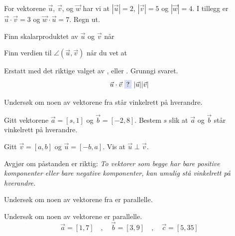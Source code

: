 For vektorene $\vec{u}$, $\vec{v}$, og $\vec{w}$ har vi at $|\vec{u}|=2$, $|\vec{v}|=5$ og $|\vec{w}|=4$. I tillegg er $\vec{u}\cdot\vec{v}=3$ og $\vec{w}\cdot\vec{u}=7$. Regn ut. \os
{}

\newpage

Finn skalarproduktet av $\vec{u}$ og $\vec{v}$ når 

Finn verdien til $\angle(\vec{u}, \vec{v})$ når du vet at

Erstatt  med det riktige valget av \sym{$\geq$}, \sym{$\leq$} eller \sym{$=$}. Grunngi svaret.
\[ \vec{u}\cdot\vec{v}\;\sym{?}\;|\vec{u}||\vec{v}| \] 


\nes

Undersøk om noen av vektorene fra  står vinkelrett på hverandre.

Gitt vektorene $\vec{a}=[s, 1]$ og $\vec{b}=[-2, 8]$. Bestem $s$ slik at $\vec{a}$ og $\vec{b}$ står vinkelrett på hverandre.

Gitt $\vec{v}=[a, b]$ og $\vec{u}=[-b, a]$. Vis at $\vec{u}\perp\vec{v}$.

 Avgjør om påstanden er riktig: \textsl{To vektorer som begge har bare positive komponenter eller bare negative komponenter, kan umulig stå vinkelrett på hverandre.}
\newpage

\nes
{}
Undersøk om noen av vektorene fra  er parallelle.

Undersøk om noen av vektorene er parallelle.
\[ \vec{a}=[1, 7]\quad,\quad\vec{b}=[3, 9]\quad,\quad \vec{c}=[5, 35] \]

